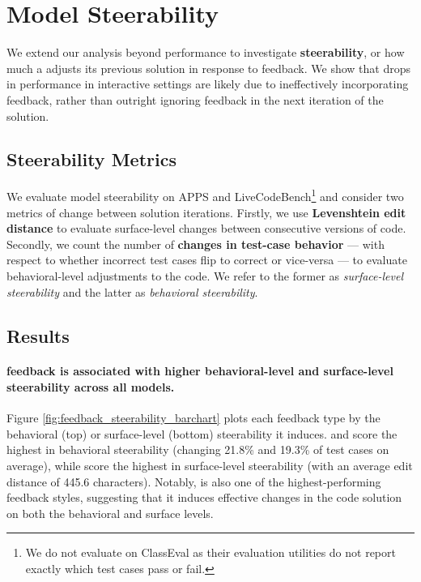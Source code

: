 


\section{Model Steerability}

We extend our analysis beyond performance to investigate \textbf{steerability}, or how much a \cm{} adjusts its previous solution in response to feedback.
We show that drops in performance in interactive settings are likely due to ineffectively incorporating feedback, rather than outright ignoring feedback in the next iteration of the solution.




\subsection{Steerability Metrics}
We evaluate model steerability on APPS and LiveCodeBench\footnote{We do not evaluate on ClassEval as their evaluation utilities do not report exactly which test cases pass or fail.} and consider two metrics of change between solution iterations. 
Firstly, we use \textbf{Levenshtein edit distance} to evaluate surface-level changes between consecutive versions of code. 
Secondly, we count the number of \textbf{changes in test-case behavior} --- with respect to whether incorrect test cases flip to correct or vice-versa --- to evaluate behavioral-level adjustments to the code.
We refer to the former as \textit{surface-level steerability} and the latter as \textit{behavioral steerability}.  



\subsection{Results}
\paragraph{\para{} feedback is associated with higher behavioral-level and surface-level steerability across all models.} 
Figure \ref{fig:feedback_steerability_barchart} plots each feedback type by the behavioral (top) or surface-level (bottom) steerability it induces.
\para{} and \cf{} score the highest in behavioral steerability (changing 21.8\% and 19.3\% of test cases on average), while \para{} score the highest in surface-level steerability (with an average edit distance of 445.6 characters).
Notably, \para{} is also one of the highest-performing feedback styles, suggesting that it induces effective changes in the code solution on both the behavioral and surface levels. 



